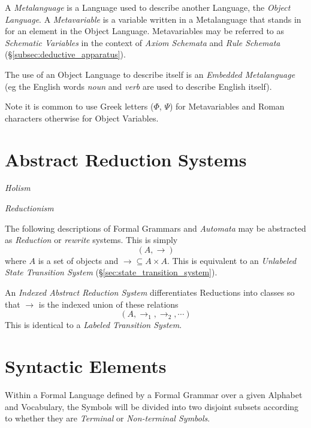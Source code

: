 \documentclass{article}
\begin{document}
A \emph{Metalanguage} is a Language used to describe another Language,
the \emph{Object Language}. A \emph{Metavariable} is a variable
written in a Metalanguage that stands in for an element in the Object
Language. Metavariables may be referred to as \emph{Schematic
  Variables} in the context of \emph{Axiom Schemata} and \emph{Rule
  Schemata} (\S \ref{subsec:deductive_apparatus}).

The use of an Object Language to describe itself is an \emph{Embedded
  Metalanguage} (eg the English words \emph{noun} and \emph{verb} are
used to describe English itself).

Note it is common to use Greek letters ($\Phi$, $\Psi$) for
Metavariables and Roman characters otherwise for Object Variables.



\section{Abstract Reduction Systems}\label{sec:abstract_rewrite}

\emph{Holism}

\emph{Reductionism}

The following descriptions of Formal Grammars and \emph{Automata} may
be abstracted as \emph{Reduction} or \emph{rewrite} systems. This is
simply
    \[(A,\rightarrow)\]
where $A$ is a set of objects and $\rightarrow \subseteq A \times
A$. This is equivalent to an \emph{Unlabeled State Transition System}
(\S\ref{sec:state_transition_system}).

An \emph{Indexed Abstract Reduction System} differentiates Reductions
into classes so that $\rightarrow$ is the indexed union of these
relations
    \[(A, \rightarrow_1, \rightarrow_2, \cdots)\]
This is identical to a \emph{Labeled Transition System}.



\section{Syntactic Elements}

Within a Formal Language defined by a Formal Grammar over a given
Alphabet and Vocabulary, the Symbols will be divided into two disjoint
subsets according to whether they are \emph{Terminal} or
\emph{Non-terminal Symbols}.
\end{document}
